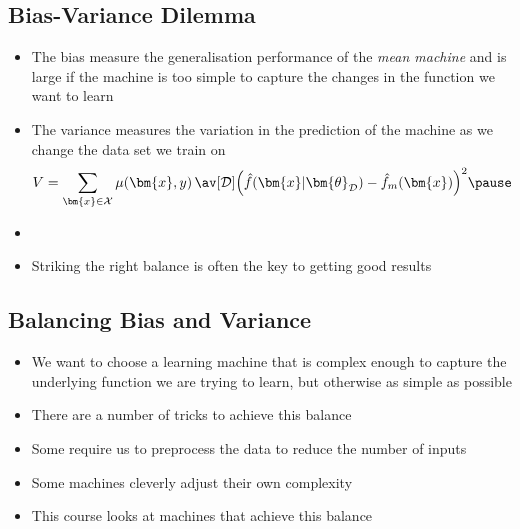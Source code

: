 \begin{slide}
\section{Bias-Variance Dilemma}

\begin{PauseHighLight}
  \begin{itemize}
  \item The bias measure the generalisation performance of the
    \textit{mean machine} and is large if the machine is too simple to
    capture the changes in the function we want to learn\pause
  \item The variance measures the variation in the prediction of the
    machine as we change the data set we train on
    \begin{align*}
      V =  \sum_{\bm{x}\in\mathcal{X}} \mu(\bm{x},y)\,
      \av[\mathcal{D}]{ \left(\hat{f}(\bm{x}\vert \bm{\theta}_{\mathcal{D}})
      - \hat{f}_m(\bm{x})\right)^2 }\pause
    \end{align*}
  \item {}\pause
  \item Striking the right balance is often the key to getting good
    results\pause 
  \end{itemize}
\end{PauseHighLight}

\end{slide}


\begin{slide}
\section[-1]{Balancing Bias and Variance}

\begin{PauseHighLight}
  \begin{itemize}
  \item We want to choose a learning machine that is complex enough to
    capture the underlying function we are trying to learn, but
    otherwise as simple as possible\pause
  \item There are a number of tricks to achieve this balance\pause
  \item Some require us to preprocess the data to reduce the number of
    inputs\pause
  \item Some machines cleverly adjust their own complexity\pause
  \item This course looks at machines that achieve this balance\pause
  \end{itemize}
\end{PauseHighLight}

\end{slide}

